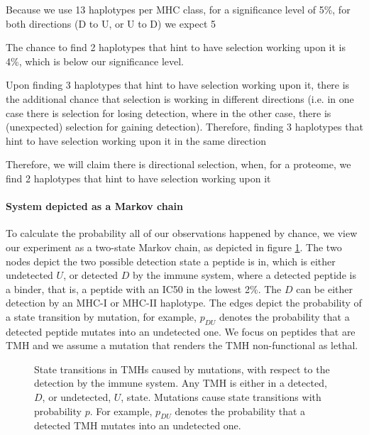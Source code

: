 Because we use 13 haplotypes per MHC class,
for a significance level of 5\%,
for both directions (D to U, or U to D)
we expect 5%

The chance to find 2 haplotypes that hint to have selection working upon it
is 4\%, which is below our significance level.

Upon finding 3 haplotypes that hint to have selection working upon it,
there is the additional chance that selection is working in different
directions (i.e. in one case there is selection for losing detection,
where in the other case, there is (unexpected) selection for gaining
detection). Therefore, finding 3 haplotypes that hint to have selection working 
upon it in the same direction 

Therefore, we will claim there is directional selection, 
when, for a proteome, we find 2 haplotypes 
that hint to have selection working upon it

\paragraph{System depicted as a Markov chain}
 
To calculate the probability all of our observations happened by chance,
we view our experiment as a two-state Markov chain, as depicted in
figure \ref{fig:markov_chain}. The two nodes depict the
two possible detection state a peptide is in, which is
either undetected $U$, or detected $D$ by the immune system,
where a detected peptide is a binder, that is, 
a peptide with an IC50 in the lowest 2\%.
The $D$ can be either detection by an MHC-I or MHC-II haplotype.
The edges depict the probability of a state transition by mutation,
for example, $p_{DU}$ denotes the probability that a detected
peptide mutates into an undetected one.
We focus on peptides that are TMH and we assume a mutation that 
renders the TMH non-functional as lethal.

\begin{figure}
  \centering
  
  \caption{
    State transitions in TMHs caused by mutations, with respect to the
    detection by the immune system. Any TMH is either in a detected, $D$, or
    undetected, $U$, state. Mutations cause state transitions with probability
    $p$. For example, $p_{DU}$ denotes the probability that a detected
    TMH mutates into an undetected one.
  }
  \label{fig:markov_chain}
\end{figure}

